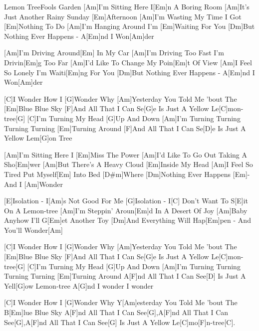 \documentclass[../main.tex]{subfiles}
\begin{document}
\begin{song}{Lemon Tree}{Fools Garden}{}
[Am]I'm Sitting Here I[Em]n A Boring Room
[Am]It's Just Another Rainy Sunday [Em]Afternoon
[Am]I'm Wasting My Time I Got [Em]Nothing To Do
[Am]I'm Hanging Around I'm [Em]Waiting For You
[Dm]But Nothing Ever Happens - A[Em]nd I Won[Am]der

[Am]I'm Driving Around[Em] In My Car
[Am]I'm Driving Too Fast I'm Drivin[Em]g Too Far
[Am]I'd Like To Change My Poin[Em]t Of View
[Am]I Feel So Lonely I'm Waiti[Em]ng For You
[Dm]But Nothing Ever Happens - A[Em]nd I Won[Am]der

[C]I Wonder How I [G]Wonder Why [Am]Yesterday You Told Me 'bout The [Em]Blue Blue Sky
[F]And All That I Can Se[G]e Is Just A Yellow Le[C]mon-tree[G]{\hh}
[C]I'm Turning My Head [G]Up And Down [Am]I'm Turning Turning Turning Turning [Em]Turning Around
[F]And All That I Can Se[D]e Is Just A Yellow Lem[G]on Tree

[Am]I'm Sitting Here I [Em]Miss The Power
[Am]I'd Like To Go Out Taking A Sho[Em]wer
[Am]But There's A Heavy Cloud [Em]Inside My Head
[Am]I Feel So Tired Put Myself[Em] Into Bed
[D#m]Where [Dm]Nothing Ever Happens [Em]- And I [Am]Wonder

[E]Isolation - I[Am]s Not Good For Me
[G]Isolation - I[C] Don't Want To S[E]it On A Lemon-tree
[Am]I'm Steppin' Aroun[Em]d In A Desert Of Joy
[Am]Baby Anyhow I'll G[Em]et Another Toy
[Dm]And Everything Will Hap[Em]pen - And You'll Wonder[Am]{\hh}

[C]I Wonder How I [G]Wonder Why [Am]Yesterday You Told Me 'bout The [Em]Blue Blue Sky
[F]And All That I Can Se[G]e Is Just A Yellow Le[C]mon-tree[G]{\hh}
[C]I'm Turning My Head [G]Up And Down [Am]I'm Turning Turning Turning Turning [Em]Turning Around
A[F]nd All That I Can See[D] Is Just A Yell[G]ow Lemon-tree A[G]nd I wonder I wonder

[C]I Wonder How I [G]Wonder Why Y[Am]esterday You Told Me 'bout The B[Em]lue Blue Sky
A[F]nd All That I Can See[G],\hh A[F]nd All That I Can See[G],\hh A[F]nd All That I Can See[G]{\hh}
Is Just A Yellow Le[C]mo[F]n-tree[C].
\end{song}
\end{document}
